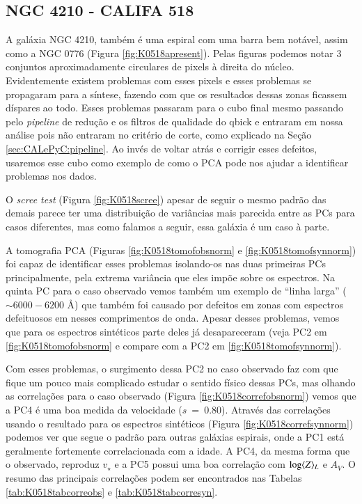 \subsection{NGC 4210 - CALIFA 518}

A galáxia NGC 4210, também é uma espiral com uma barra bem notável, assim como a NGC 0776 (Figura
\ref{fig:K0518apresent}). Pelas figuras podemos notar 3 conjuntos aproximadamente circulares de pixels à direita do
núcleo. Evidentemente existem problemas com esses pixels e esses problemas se propagaram para a síntese, fazendo com que
os resultados dessas zonas ficassem díspares ao todo. Esses problemas passaram para o cubo final mesmo passando pelo
{\em pipeline} de redução e os filtros de qualidade do {\sc qbick} e entraram em nossa análise pois não entraram no
critério de corte, como explicado na Seção \ref{sec:CALePyC:pipeline}. Ao invés de voltar atrás e corrigir esses
defeitos, usaremos esse cubo como exemplo de como o PCA pode nos ajudar a identificar problemas nos dados.

O {\em scree test} (Figura \ref{fig:K0518scree}) apesar de seguir o mesmo padrão das demais parece ter uma distribuição
de variâncias mais parecida entre as PCs para casos diferentes, mas como falamos a seguir, essa galáxia é um caso à
parte.

A tomografia PCA (Figuras \ref{fig:K0518tomofobsnorm} e \ref{fig:K0518tomofsynnorm}) foi capaz de identificar esses
problemas isolando-os nas duas primeiras PCs principalmente, pela extrema variância que eles impõe sobre os espectros.
Na quinta PC para o caso observado vemos também um exemplo de ``linha larga'' ($\sim6000-6200$ \AA) que também foi
causado por defeitos em zonas com espectros defeituosos em nesses comprimentos de onda. Apesar desses problemas, vemos
que para os espectros sintéticos parte deles já desapareceram (veja PC2 em \ref{fig:K0518tomofobsnorm} e compare com a
PC2 em \ref{fig:K0518tomofsynnorm}).

Com esses problemas, o surgimento dessa PC2 no caso observado faz com que fique um pouco mais complicado estudar o
sentido físico dessas PCs, mas olhando as correlações para o caso observado (Figura \ref{fig:K0518correfobsnorm}) vemos
que a PC4 é uma boa medida da velocidade ($s\ =\ 0.80$). Através das correlações usando o resultado para os espectros
sintéticos (Figura \ref{fig:K0518correfsynnorm}) podemos ver que segue o padrão para outras galáxias espirais, onde a
PC1 está geralmente fortemente correlacionada com a idade. A PC4, da mesma forma que o observado, reproduz $v_\star$ e a
PC5 possui uma boa correlação com $\log \meanL{Z}$ e $A_V$. O resumo das principais correlações podem ser encontrados
nas Tabelas \ref{tab:K0518tabcorreobs} e \ref{tab:K0518tabcorresyn}.

